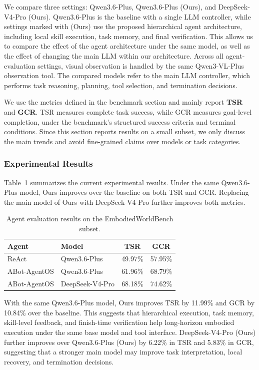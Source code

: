 We compare three settings: Qwen3.6-Plus, Qwen3.6-Plus (Ours), and DeepSeek-V4-Pro (Ours). Qwen3.6-Plus is the baseline with a single LLM controller, while settings marked with (Ours) use the proposed hierarchical agent architecture, including local skill execution, task memory, and final verification. This allows us to compare the effect of the agent architecture under the same model, as well as the effect of changing the main LLM within our architecture. Across all agent-evaluation settings, visual observation is handled by the same Qwen3-VL-Plus observation tool. The compared models refer to the main LLM controller, which performs task reasoning, planning, tool selection, and termination decisions. 

We use the metrics defined in the benchmark section and mainly report \textbf{TSR} and \textbf{GCR}. TSR
measures complete task success, while GCR measures goal-level completion,  under the benchmark's structured success
criteria and terminal conditions. Since this section
reports results on a small subset, we only discuss the main trends and
avoid fine-grained claims over models or task categories.

\subsubsection{Experimental Results}
\label{subsubsec:agent-main-results}


Table~\ref{tab:stage1-main-results} summarizes the current experimental
results. Under the same Qwen3.6-Plus model, Ours improves over the
baseline on both TSR and GCR. Replacing the main model of Ours with
DeepSeek-V4-Pro further improves both metrics.

\begin{table}[t]
    \centering
    \caption{Agent evaluation results on the EmbodiedWorldBench subset.}
    \label{tab:stage1-main-results}
    \begin{tabular}{llcc}
        \hline
        Agent & Model & TSR & GCR \\
        \hline
        ReAct & Qwen3.6-Plus & 49.97\% & 57.95\% \\
        ABot-AgentOS & Qwen3.6-Plus& 61.96\% & 68.79\% \\
        ABot-AgentOS & DeepSeek-V4-Pro & 68.18\% & 74.62\% \\
        \hline
    \end{tabular}
\end{table}

With the same Qwen3.6-Plus model, Ours improves TSR by 11.99\% and GCR by 10.84\% over the baseline. This suggests that hierarchical execution, task memory, skill-level feedback, and finish-time verification help long-horizon embodied execution under the same base model and tool interface. DeepSeek-V4-Pro (Ours) further improves over Qwen3.6-Plus (Ours) by 6.22\% in TSR and 5.83\% in GCR, suggesting that a stronger main model may improve task interpretation, local recovery, and termination decisions.

